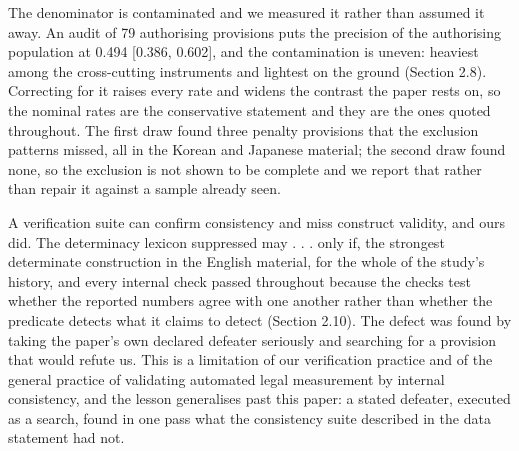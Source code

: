 The denominator is contaminated and we measured it rather than assumed it away. An audit of 79 authorising provisions puts the precision of the authorising population at 0.494 [0.386, 0.602], and the contamination is uneven: heaviest among the cross-cutting instruments and lightest on the ground (Section 2.8). Correcting for it raises every rate and widens the contrast the paper rests on, so the nominal rates are the conservative statement and they are the ones quoted throughout. The first draw found three penalty provisions that the exclusion patterns missed, all in the Korean and Japanese material; the second draw found none, so the exclusion is not shown to be complete and we report that rather than repair it against a sample already seen.

A verification suite can confirm consistency and miss construct validity, and ours did. The determinacy lexicon suppressed may . . . only if, the strongest determinate construction in the English material, for the whole of the study's history, and every internal check passed throughout because the checks test whether the reported numbers agree with one another rather than whether the predicate detects what it claims to detect (Section 2.10). The defect was found by taking the paper's own declared defeater seriously and searching for a provision that would refute us. This is a limitation of our verification practice and of the general practice of validating automated legal measurement by internal consistency, and the lesson generalises past this paper: a stated defeater, executed as a search, found in one pass what the consistency suite described in the data statement had not.

